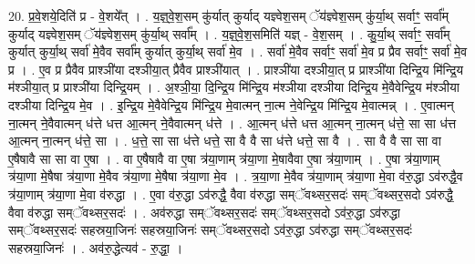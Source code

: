 \documentclass[17pt]{extarticle}
\begin{document}
20. प्र॒वे॒शये॒दिति॑ प्र - वे॒शये᳚त् । . य॒ज्ञ्॒वे॒श॒सम् कु॑र्यात् कुर्याद् यज्ञ्वेश॒सम् ॅय॑ज्ञ्वेश॒सम् कु॑र्या॒थ् सर्वाꣳ॒॒ सर्वा᳚म् कुर्याद् यज्ञ्वेश॒सम् ॅय॑ज्ञ्वेश॒सम् कु॑र्या॒थ् सर्वा᳚म् । . य॒ज्ञ्॒वे॒श॒समिति॑ यज्ञ् - वे॒श॒सम् । . कु॒र्या॒थ् सर्वाꣳ॒॒ सर्वा᳚म् कुर्यात् कुर्या॒थ् सर्वा॑ मे॒वैव सर्वा᳚म् कुर्यात् कुर्या॒थ् सर्वा॑ मे॒व । . सर्वा॑ मे॒वैव सर्वाꣳ॒॒ सर्वा॑ मे॒व प्र प्रैव सर्वाꣳ॒॒ सर्वा॑ मे॒व प्र । . ए॒व प्र प्रैवैव प्राश्ञी॑या दश्ञीया॒त् प्रैवैव प्राश्ञी॑यात् । . प्राश्ञी॑या दश्ञीया॒त् प्र प्राश्ञी॑या दिन्द्रि॒य मि॑न्द्रि॒य म॑श्ञीया॒त् प्र प्राश्ञी॑या दिन्द्रि॒यम् । . अ॒श्ञी॒या॒ दि॒न्द्रि॒य मि॑न्द्रि॒य म॑श्ञीया दश्ञीया दिन्द्रि॒य मे॒वैवेन्द्रि॒य म॑श्ञीया दश्ञीया दिन्द्रि॒य मे॒व । . इ॒न्द्रि॒य मे॒वैवेन्द्रि॒य मि॑न्द्रि॒य मे॒वात्मन् ना॒त्म ने॒वेन्द्रि॒य मि॑न्द्रि॒य मे॒वात्मन्न् । . ए॒वात्मन् ना॒त्मन् ने॒वैवात्मन् ध॑त्ते धत्त आ॒त्मन् ने॒वैवात्मन् ध॑त्ते । . आ॒त्मन् ध॑त्ते धत्त आ॒त्मन् ना॒त्मन् ध॑त्ते॒ सा सा ध॑त्त आ॒त्मन् ना॒त्मन् ध॑त्ते॒ सा । . ध॒त्ते॒ सा सा ध॑त्ते धत्ते॒ सा वै वै सा ध॑त्ते धत्ते॒ सा वै । . सा वै वै सा सा वा ए॒षैषावै सा सा वा ए॒षा । . वा ए॒षैषावै वा ए॒षा त्र॑या॒णाम् त्र॑या॒णा मे॒षावैवा ए॒षा त्र॑या॒णाम् । . ए॒षा त्र॑या॒णाम् त्र॑या॒णा मे॒षैषा त्र॑या॒णा मे॒वैव त्र॑या॒णा मे॒षैषा त्र॑या॒णा मे॒व । . त्र॒या॒णा मे॒वैव त्र॑या॒णाम् त्र॑या॒णा मे॒वा व॑रु॒द्धा ऽव॑रुद्धै॒व त्र॑या॒णाम् त्र॑या॒णा मे॒वा व॑रुद्धा । . ए॒वा व॑रु॒द्धा ऽव॑रुद्धै॒ वैवा व॑रुद्धा सम्ॅवथ्सर॒सदः॑ सम्ॅवथ्सर॒सदो ऽव॑रुद्धै॒ वैवा व॑रुद्धा सम्ॅवथ्सर॒सदः॑ । . अव॑रुद्धा सम्ॅवथ्सर॒सदः॑ सम्ॅवथ्सर॒सदो ऽव॑रु॒द्धा ऽव॑रुद्धा सम्ॅवथ्सर॒सदः॑ सहस्रया॒जिनः॑ सहस्रया॒जिनः॑ सम्ॅवथ्सर॒सदो ऽव॑रु॒द्धा ऽव॑रुद्धा सम्ॅवथ्सर॒सदः॑ सहस्रया॒जिनः॑ । . अव॑रु॒द्धेत्यव॑ - रु॒द्धा॒ । \newline
\end{document}
